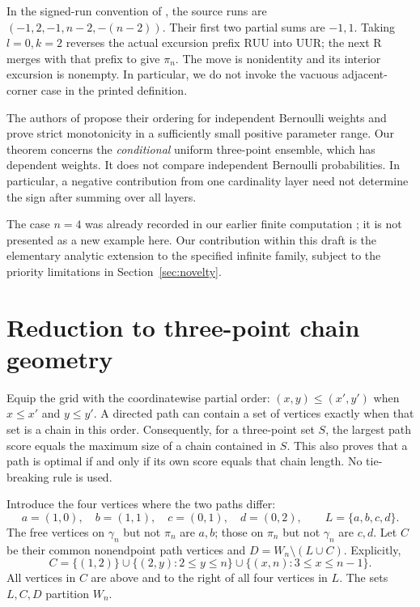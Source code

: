\documentclass[11pt,a4paper]{article}
\newcommand{\R}{\mathrm R}
\newcommand{\U}{\mathrm U}
\begin{document}
In the signed-run convention of \cite{MN}, the source runs are
$(-1,2,-1,n-2,-(n-2))$. Their first two partial sums are $-1,1$.
Taking $l=0,k=2$ reverses the actual excursion prefix
$\R\U\U$ into $\U\U\R$; the next $\R$ merges with that prefix to give
$\pi_n$. The move is nonidentity and its interior excursion is nonempty.
In particular, we do not invoke the vacuous adjacent-corner case in
the printed definition.

The authors of \cite{MN} propose their ordering for independent
Bernoulli weights and prove strict monotonicity in a sufficiently small
positive parameter range. Our theorem concerns the \emph{conditional}
uniform three-point ensemble, which has dependent weights. It does
not compare independent Bernoulli probabilities. In particular,
a negative contribution from one cardinality layer need not determine
the sign after summing over all layers.

The case $n=4$ was already recorded in our earlier finite computation
\cite{B1}; it is not presented as a new example here. Our contribution
within this draft is the elementary analytic extension to the
specified infinite family, subject to the priority limitations in
Section~\ref{sec:novelty}.

\section{Reduction to three-point chain geometry}
Equip the grid with the coordinatewise partial order:
$(x,y)\leq(x',y')$ when $x\leq x'$ and $y\leq y'$.
A directed path can contain a set of vertices exactly when that set is
a chain in this order. Consequently, for a three-point set $S$, the
largest path score equals the maximum size of a chain contained in $S$.
This also proves that a path is optimal if and only if its own score
equals that chain length. No tie-breaking rule is used.

Introduce the four vertices where the two paths differ:
\[
 a=(1,0),\quad b=(1,1),\quad c=(0,1),\quad d=(0,2),
 \qquad
 L=\{a,b,c,d\}.
\]
The free vertices on $\gamma_n$ but not $\pi_n$ are $a,b$; those
on $\pi_n$ but not $\gamma_n$ are $c,d$. Let $C$ be their common
nonendpoint path vertices and $D=W_n\setminus(L\cup C)$. Explicitly,
\[
 C=\{(1,2)\}\cup\{(2,y):2\le y\le n\}
          \cup\{(x,n):3\le x\le n-1\}.
\]
All vertices in $C$ are above and to the right of all four vertices
in $L$. The sets $L,C,D$ partition $W_n$.
\end{document}

